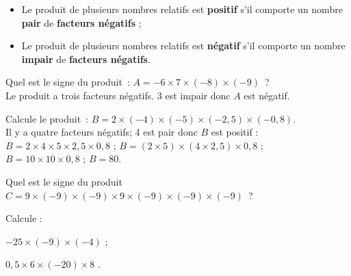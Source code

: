 \vspace{2cm}
 
 
 \begin{aconnaitre}
 \begin{itemize}
  \item Le produit de plusieurs nombres relatifs est \textbf{positif} s'il comporte un nombre \textbf{pair} de \textbf{facteurs négatifs} ;
  \item Le produit de plusieurs nombres relatifs est \textbf{négatif} s'il comporte un nombre \textbf{impair} de \textbf{facteurs négatifs}.
  \end{itemize}
\end{aconnaitre}

\newpage

\begin{methode*1}

 \begin{exemple*1}
Quel est le signe du produit : $A = -6 \times 7 \times (-8) \times (-9)$ ? \\[0.5em]
Le produit a trois facteurs négatifs. 3 est impair donc $A$ est négatif.
 \end{exemple*1}
 
  \begin{exemple*1}
Calcule le produit : $B = 2 \times (-4) \times (-5) \times (-2,5) \times (-0,8)$. \\[0.5em]
Il y a quatre facteurs négatifs; 4 est pair donc $B$ est positif : \\
$B = 2 \times 4 \times 5 \times 2,5 \times 0,8$ ; \hspace{1cm}  $B = (2 \times 5) \times (4 \times 2,5) \times 0,8$ ; \\       
$B = 10 \times 10 \times 0,8$ ; \hspace{1cm} $B = 80$.
 \end{exemple*1}
 
 \exercice  
Quel est le signe du produit $C = 9 \times (-9) \times (-9) \times 9 \times (-9) \times (-9) \times (-9)$ ?
     
 \exercice  
Calcule :
\vspace{.5em}
\begin{colenumerate}{2}
 \item $-25 \times (-9) \times (-4)$ \dotfill;
 \item $0,5 \times 6 \times (-20) \times 8$ \dotfill.
 \end{colenumerate}

 \end{methode*1}
 
